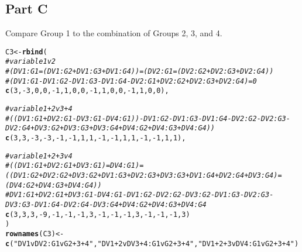 \documentclass{article}\usepackage[]{graphicx}\usepackage[]{color}
\makeatletter
\newcommand{\hlnum}[1]{\textcolor[rgb]{0.686,0.059,0.569}{#1}}%
\newcommand{\hlstr}[1]{\textcolor[rgb]{0.192,0.494,0.8}{#1}}%
\newcommand{\hlcom}[1]{\textcolor[rgb]{0.678,0.584,0.686}{\textit{#1}}}%
\newcommand{\hlopt}[1]{\textcolor[rgb]{0,0,0}{#1}}%
\newcommand{\hlstd}[1]{\textcolor[rgb]{0.345,0.345,0.345}{#1}}%
\newcommand{\hlkwb}[1]{\textcolor[rgb]{0.69,0.353,0.396}{#1}}%
\newcommand{\hlkwd}[1]{\textcolor[rgb]{0.737,0.353,0.396}{\textbf{#1}}}%
\newenvironment{kframe}{%
 \def\at@end@of@kframe{}%
 \ifinner\ifhmode%
  \def\at@end@of@kframe{\end{minipage}}%
  \begin{minipage}{\columnwidth}%
 \fi\fi%
 \def\FrameCommand##1{\hskip\@totalleftmargin \hskip-\fboxsep
 \colorbox{shadecolor}{##1}\hskip-\fboxsep
     \hskip-\linewidth \hskip-\@totalleftmargin \hskip\columnwidth}%
 \MakeFramed {\advance\hsize-\width
   \@totalleftmargin\z@ \linewidth\hsize
   \@setminipage}}%
 {\par\unskip\endMakeFramed%
 \at@end@of@kframe}
\newenvironment{knitrout}{}{} %
\makeatother
\begin{document}
\subsection{Part C}
Compare Group 1 to the combination of Groups 2, 3, and 4.
\begin{knitrout}
\color{fgcolor}\begin{kframe}
\begin{alltt}
\hlstd{C3} \hlkwb{<-} \hlkwd{rbind}\hlstd{(}
  \hlcom{# variable 1 v 2}
  \hlcom{# (DV1:G1 = (DV1:G2 + DV1:G3 + DV1:G4)) = (DV2:G1 = (DV2:G2 + DV2:G3 + DV2:G4))}
  \hlcom{# (DV1:G1 - DV1:G2 - DV1:G3 - DV1:G4 - DV2:G1 + DV2:G2 + DV2:G3 + DV2:G4) = 0}
  \hlkwd{c}\hlstd{(}\hlnum{3}\hlstd{,}\hlopt{-}\hlnum{3}\hlstd{,}\hlnum{0}\hlstd{,}\hlnum{0}\hlstd{,} \hlopt{-}\hlnum{1}\hlstd{,}\hlnum{1}\hlstd{,}\hlnum{0}\hlstd{,}\hlnum{0}\hlstd{,} \hlopt{-}\hlnum{1}\hlstd{,}\hlnum{1}\hlstd{,}\hlnum{0}\hlstd{,}\hlnum{0}\hlstd{,} \hlopt{-}\hlnum{1}\hlstd{,}\hlnum{1}\hlstd{,}\hlnum{0}\hlstd{,}\hlnum{0}\hlstd{),}

  \hlcom{# variable 1 + 2 v 3 + 4}
  \hlcom{# ((DV1:G1 + DV2:G1 - DV3:G1 - DV4:G1)) - DV1:G2 - DV1:G3 - DV1:G4 - DV2:G2 - DV2:G3 - DV2:G4 + DV3:G2 + DV3:G3 + DV3:G4 + DV4:G2 + DV4:G3 + DV4:G4))}
  \hlkwd{c}\hlstd{(}\hlnum{3}\hlstd{,}\hlnum{3}\hlstd{,}\hlopt{-}\hlnum{3}\hlstd{,}\hlopt{-}\hlnum{3}\hlstd{,}  \hlopt{-}\hlnum{1}\hlstd{,}\hlopt{-}\hlnum{1}\hlstd{,}\hlnum{1}\hlstd{,}\hlnum{1}\hlstd{,}  \hlopt{-}\hlnum{1}\hlstd{,}\hlopt{-}\hlnum{1}\hlstd{,}\hlnum{1}\hlstd{,}\hlnum{1}\hlstd{,} \hlopt{-}\hlnum{1}\hlstd{,}\hlopt{-}\hlnum{1}\hlstd{,}\hlnum{1}\hlstd{,}\hlnum{1}\hlstd{),}

  \hlcom{# variable 1 + 2 + 3 v 4}
  \hlcom{# ((DV1:G1 + DV2:G1 + DV3:G1) = DV4:G1) = ((DV1:G2 + DV2:G2 + DV3:G2 + DV1:G3 + DV2:G3 + DV3:G3 + DV1:G4 + DV2:G4 + DV3:G4) = (DV4:G2 + DV4:G3 + DV4:G4))}
  \hlcom{# DV1:G1 + DV2:G1 + DV3:G1 - DV4:G1 - DV1:G2 - DV2:G2 - DV3:G2 - DV1:G3 - DV2:G3 - DV3:G3 - DV1:G4 - DV2:G4 - DV3:G4 + DV4:G2 + DV4:G3 + DV4:G4}
  \hlkwd{c}\hlstd{(}\hlnum{3}\hlstd{,}\hlnum{3}\hlstd{,}\hlnum{3}\hlstd{,}\hlopt{-}\hlnum{9}\hlstd{,}  \hlopt{-}\hlnum{1}\hlstd{,}\hlopt{-}\hlnum{1}\hlstd{,}\hlopt{-}\hlnum{1}\hlstd{,}\hlnum{3}\hlstd{,} \hlopt{-}\hlnum{1}\hlstd{,}\hlopt{-}\hlnum{1}\hlstd{,}\hlopt{-}\hlnum{1}\hlstd{,}\hlnum{3}\hlstd{,}  \hlopt{-}\hlnum{1}\hlstd{,}\hlopt{-}\hlnum{1}\hlstd{,}\hlopt{-}\hlnum{1}\hlstd{,}\hlnum{3}\hlstd{)}
\hlstd{)}
\hlkwd{rownames}\hlstd{(C3)} \hlkwb{<-} \hlkwd{c}\hlstd{(}\hlstr{"DV1vDV2:G1vG2+3+4"}\hlstd{,} \hlstr{"DV1+2vDV3+4:G1vG2+3+4"}\hlstd{,} \hlstr{"DV1+2+3vDV4:G1vG2+3+4"}\hlstd{)}
\end{alltt}
\end{kframe}
\end{knitrout}
\end{document}
